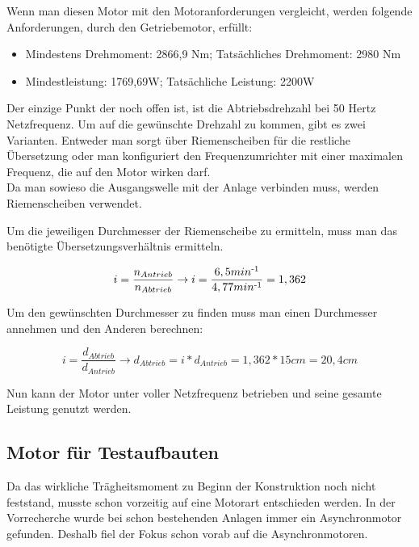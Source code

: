Wenn man diesen Motor mit den Motoranforderungen vergleicht, werden folgende Anforderungen, durch den Getriebemotor, erfüllt:

\begin{itemize}
	\item{Mindestens Drehmoment: 2866,9 Nm; Tatsächliches Drehmoment: 2980 Nm}
	\item{Mindestleistung: 1769,69W; Tatsächliche Leistung: 2200W}
\end{itemize}

Der einzige Punkt der noch offen ist, ist die Abtriebsdrehzahl bei 50 Hertz Netzfrequenz. Um auf die gewünschte Drehzahl zu kommen, gibt es zwei Varianten. Entweder man sorgt über Riemenscheiben für die restliche Übersetzung oder man konfiguriert den Frequenzumrichter mit einer maximalen Frequenz, die auf den Motor wirken darf. \\

Da man sowieso die Ausgangswelle mit der Anlage verbinden muss, werden Riemenscheiben verwendet.

Um die jeweiligen Durchmesser der Riemenscheibe zu ermitteln, muss man das benötigte Übersetzungsverhältnis ermitteln.

\begin{center}
\begin{equation}
  \label{eq:5}
	i=  \frac{n_{Antrieb}}{n_{Abtrieb}} \rightarrow i = \frac{6,5 min\textsuperscript{-1}}{4,77 min\textsuperscript{-1}} = 1,362
\end{equation} 
\end{center}

Um den gewünschten Durchmesser zu finden muss man einen Durchmesser annehmen und den Anderen berechnen:

\begin{center}
\begin{equation}
  \label{eq:6}
	i=  \frac{d_{Abtrieb}}{d_{Antrieb}} \rightarrow d_{Abtrieb} = i * d_{Antrieb} =  1,362 * 15 cm = 20,4cm
\end{equation} 
\end{center}

Nun kann der Motor unter voller Netzfrequenz betrieben und seine gesamte Leistung genutzt werden. 

\subsection{Motor für Testaufbauten}
\label{sec:motorFuerTestaufbauten}

Da das wirkliche Trägheitsmoment zu Beginn der Konstruktion noch nicht feststand, musste schon vorzeitig auf eine Motorart entschieden werden. In der Vorrecherche wurde bei schon bestehenden Anlagen immer ein Asynchronmotor gefunden. Deshalb fiel der Fokus schon vorab auf die Asynchronmotoren.
\newpage
